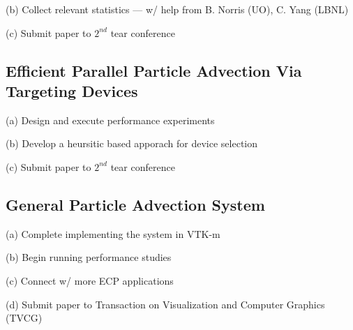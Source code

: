 \documentclass{article}
\begin{document}
(b) Collect relevant statistics --- w/ help from B. Norris (UO), C. Yang (LBNL)

(c) Submit paper to $2^{nd}$ tear conference

\subsection{Efficient Parallel Particle Advection Via Targeting Devices}
(a) Design and execute performance experiments

(b) Develop a heursitic based apporach for device selection

(c) Submit paper to $2^{nd}$ tear conference


\subsection{General Particle Advection System}
(a) Complete implementing the system in VTK-m

(b) Begin running performance studies

(c) Connect w/ more ECP applications

(d) Submit paper to Transaction on Visualization and Computer Graphics (TVCG)
\end{document}
